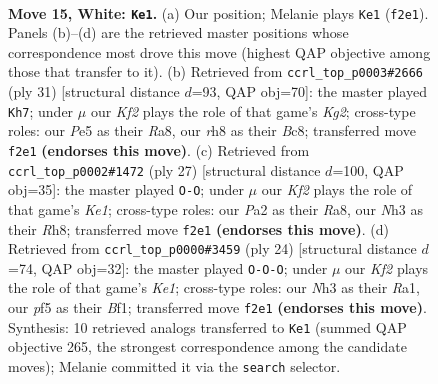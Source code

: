 \documentclass[11pt]{article}
\begin{document}
\clearpage

\begin{figure}[p]\centering
\begin{subfigure}{0.46\textwidth}\centering
\resizebox{\linewidth}{!}{%
\newchessgame
\chessboard[
  setfen={rnbk3r/1p1n4/4p1p1/pNqpPp2/5P1p/1P5N/P1P2KPP/R2Q1B1R w - - 0 15},
  showmover=false,
  pgfstyle=straightmove, color=movearrow, markmove={f2-e1}
]}
\caption{}
\end{subfigure}\hfill
\begin{subfigure}{0.46\textwidth}\centering
\resizebox{\linewidth}{!}{%
\newchessgame
\chessboard[
  setfen={r1bq1r2/1pp2pk1/1nnp2p1/1N5p/2P1P2P/1PQ2P2/4N1P1/3RKB1R b K - 1 16},
  showmover=false,
  pgfstyle=straightmove, color=movearrow, markmove={g7-h7}
]}
\caption{}
\end{subfigure}
\\[4pt]
\begin{subfigure}{0.46\textwidth}\centering
\resizebox{\linewidth}{!}{%
\newchessgame
\chessboard[
  setfen={rn2k2r/pp2qpp1/2pb3p/3p4/3P4/1QN1P3/PP3PPP/2R1KB1R b Kkq - 3 14},
  showmover=false,
  pgfstyle=straightmove, color=movearrow, markmove={e8-g8}
]}
\caption{}
\end{subfigure}\hfill
\begin{subfigure}{0.46\textwidth}\centering
\resizebox{\linewidth}{!}{%
\newchessgame
\chessboard[
  setfen={rn2k2r/ppqnbpp1/4p1p1/3p4/3P2P1/1QN1PP2/PP1B3P/R3KB1R w KQkq - 0 13},
  showmover=false,
  pgfstyle=straightmove, color=movearrow, markmove={e1-c1}
]}
\caption{}
\end{subfigure}
\caption{\textbf{Move 15, White: \texttt{Ke1}.} (a) Our position; Melanie plays \texttt{Ke1} (\texttt{f2e1}). Panels (b)--(d) are the retrieved master positions whose correspondence most drove this move (highest QAP objective among those that transfer to it). (b) Retrieved from \texttt{ccrl\_top\_p0003\#2666} (ply 31) [structural distance $d$=93, QAP obj=70]: the master played \texttt{Kh7}; under $\mu$ our \emph{Kf2} plays the role of that game's \emph{Kg2}; cross-type roles: our \emph{P}e5 as their \emph{R}a8, our \emph{r}h8 as their \emph{B}c8; transferred move \texttt{f2e1} \textbf{(endorses this move)}. (c) Retrieved from \texttt{ccrl\_top\_p0002\#1472} (ply 27) [structural distance $d$=100, QAP obj=35]: the master played \texttt{O-O}; under $\mu$ our \emph{Kf2} plays the role of that game's \emph{Ke1}; cross-type roles: our \emph{P}a2 as their \emph{R}a8, our \emph{N}h3 as their \emph{R}h8; transferred move \texttt{f2e1} \textbf{(endorses this move)}. (d) Retrieved from \texttt{ccrl\_top\_p0000\#3459} (ply 24) [structural distance $d$=74, QAP obj=32]: the master played \texttt{O-O-O}; under $\mu$ our \emph{Kf2} plays the role of that game's \emph{Ke1}; cross-type roles: our \emph{N}h3 as their \emph{R}a1, our \emph{p}f5 as their \emph{B}f1; transferred move \texttt{f2e1} \textbf{(endorses this move)}. Synthesis: 10 retrieved analogs transferred to \texttt{Ke1} (summed QAP objective 265, the strongest correspondence among the candidate moves); Melanie committed it via the \texttt{search} selector.}
\label{fig:thought-m28}
\end{figure}
\end{document}
